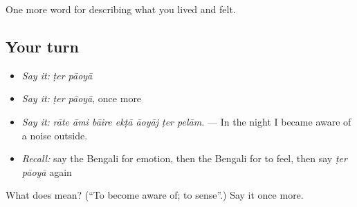 \begin{grammarlens}[title={What you've built}]
One more word for describing what you lived and felt.
\end{grammarlens}

\subsection*{Your turn}
\begin{itemize}
\raggedright
  \item \emph{Say it:} \emph{ṭer pāoyā}
  \item \emph{Say it:} \emph{ṭer pāoyā}, once more
  \item \emph{Say it:} \emph{rāte āmi bāire ekṭā āoyāj ṭer pelām.} — In the night I became aware of a noise outside.
  \item \emph{Recall:} say the Bengali for emotion, then the Bengali for to feel, then say \emph{ṭer pāoyā} again
\end{itemize}

\begin{tcolorbox}[breakable,colback=teal!4,colframe=teal!35!black,title={Before you move on}]
What does   mean? (\textquotedblleft{}To become aware of; to sense\textquotedblright{}.) Say it once more.
\end{tcolorbox}
